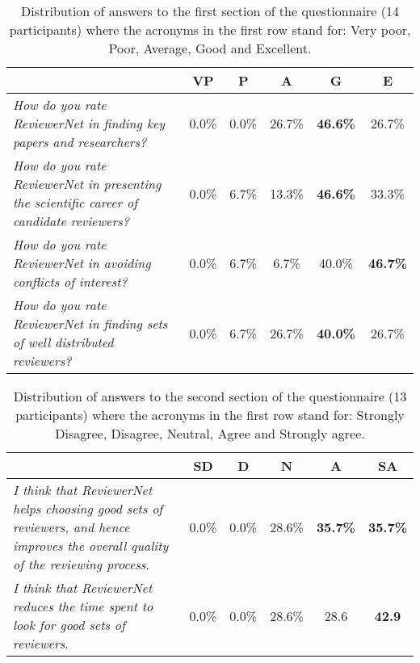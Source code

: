 \begin{table*}[!t]
	\renewcommand{\arraystretch}{1.3}
	\caption{ Distribution of answers to the first section of the questionnaire (14 participants) where the acronyms in the first row stand for: Very poor, Poor, Average, Good and Excellent.}
	\vspace{0.3cm}
	\label{table:formsection1}
    \centering%
		\begin{tabular}{|p{}|c|c|c|c|c|}
			\hline
			& VP & P & A & G & E\\
			\hline 
			{{\em How do you rate ReviewerNet in finding key papers and researchers?}}                      & 0.0\% & 0.0\% &  26.7\% & {\bf 46.6\%} & 26.7\% \\
			\hline
			{{\em How do you rate ReviewerNet in presenting the scientific career of candidate reviewers?}} & 0.0\% & 6.7\% &  13.3\% & {\bf 46.6\%} & 33.3\% \\
			\hline
			{{\em How do you rate ReviewerNet in avoiding conflicts of interest?}}                          & 0.0\% & 6.7\% &   6.7\% & 40.0\% & {\bf 46.7\%} \\
			\hline
			{{\em How do you rate ReviewerNet in finding sets of well distributed reviewers?}}              & 0.0\% & 6.7\% &  26.7\% & {\bf 40.0\%} & 26.7\% \\
			\hline
		\end{tabular}
\end{table*}

\begin{table*}[!t]
	\renewcommand{\arraystretch}{1.3}
	\caption{Distribution of answers to the second section of the questionnaire  (13 participants) where the acronyms in the first row stand for: Strongly Disagree, Disagree, Neutral, Agree and Strongly agree.}
	\vspace{0.3cm}
	\label{table:formsection2}
    \centering%
		\begin{tabular}{|p{}|c|c|c|c|c|}
			\hline
			& SD & D & N & A & SA\\
			\hline 
			{{\em I think that ReviewerNet helps choosing good sets of reviewers, and hence improves the overall quality of the reviewing process}.} & 0.0\% & 0.0\% &  28.6\% & {\bf 35.7\%} & {\bf 35.7\%} \\
			\hline
			{{\em I think that ReviewerNet reduces the time spent to look for good sets of reviewers}.}                                              & 0.0\% & 0.0\% &  28.6\% & 28.6 & {\bf 42.9} \\
			\hline 
		\end{tabular}
	\par
\end{table*}



